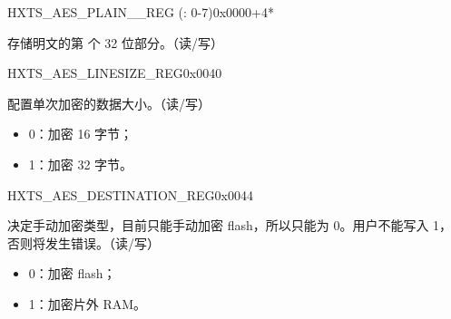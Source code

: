 

\begin{register}{H}{XTS\_AES\_PLAIN\_\_REG (: 0-7)}{0x0000+4*}\label{regdesc:XTSAESPLAINNREG}
%
\regnewline%
\begin{regdesc}\begin{reglist}
\label{fielddesc:XTSAESPLAINN}\item [XTS\_AES\_PLAIN\_\regindex{n}] 存储明文的第  个 32 位部分。（读/写）
\end{reglist}\end{regdesc}
\end{register}



\begin{register}{H}{XTS\_AES\_LINESIZE\_REG}{0x0040}\label{regdesc:XTSAESLINESIZEREG}
%
%
\regnewline%
\begin{regdesc}\begin{reglist}
\item [XTS\_AES\_LINESIZE] 配置单次加密的数据大小。（读/写）
    \begin{itemize}
        \item 0：加密 16 字节；
        \item 1：加密 32 字节。
    \end{itemize}
\end{reglist}\end{regdesc}
\end{register}


\begin{register}{H}{XTS\_AES\_DESTINATION\_REG}{0x0044}\label{regdesc:XTSAESDESTINATIONREG}
%
%
\regnewline%
\begin{regdesc}\begin{reglist}
\item [XTS\_AES\_DESTINATION] 决定手动加密类型，目前只能手动加密 flash，所以只能为 0。用户不能写入 1，否则将发生错误。（读/写）
    \begin{itemize}
        \item 0：加密 flash；
        \item 1：加密片外 RAM。
    \end{itemize}

\end{reglist}\end{regdesc}
\end{register}


